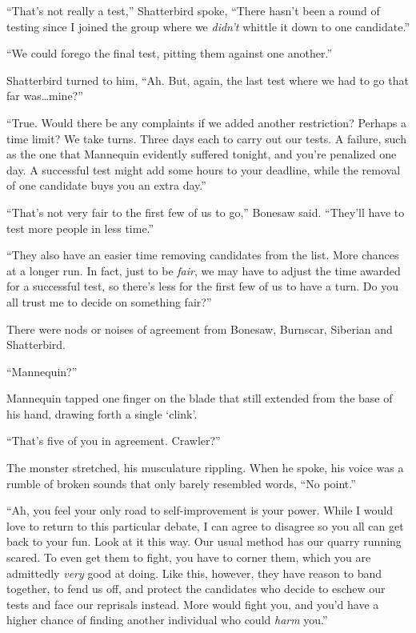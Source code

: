 ``That's not really a test,'' Shatterbird spoke, ``There hasn't been a round of testing since I joined the group where we \emph{didn't} whittle it down to one candidate.''



``We could forego the final test, pitting them against one another.''



Shatterbird turned to him, ``Ah.  But, again, the last test where we had to go that far was\ldots mine?''



``True.  Would there be any complaints if we added another restriction?  Perhaps a time limit?  We take turns.  Three days each to carry out our tests.  A failure, such as the one that Mannequin evidently suffered tonight, and you're penalized one day.  A successful test might add some hours to your deadline, while the removal of one candidate buys you an extra day.''



``That's not very fair to the first few of us to go,'' Bonesaw said.  ``They'll have to test more people in less time.''



``They also have an easier time removing candidates from the list.  More chances at a longer run.  In fact, just to be \emph{fair}, we may have to adjust the time awarded for a successful test, so there's less for the first few of us to have a turn.  Do you all trust me to decide on something fair?''



There were nods or noises of agreement from Bonesaw, Burnscar, Siberian and Shatterbird.



``Mannequin?''



Mannequin tapped one finger on the blade that still extended from the base of his hand, drawing forth a single `clink'.



``That's five of you in agreement.  Crawler?''



The monster stretched, his musculature rippling.  When he spoke, his voice was a rumble of broken sounds that only barely resembled words, ``No point.''



``Ah, you feel your only road to self-improvement is your power.  While I would love to return to this particular debate, I can agree to disagree so you all can get back to your fun.  Look at it this way.  Our usual method has our quarry running scared.  To even get them to fight, you have to corner them, which you are admittedly \emph{very} good at doing.  Like this, however, they have reason to band together, to fend us off, and protect the candidates who decide to eschew our tests and face our reprisals instead.  More would fight you, and you'd have a higher chance of finding another individual who could \emph{harm} you.''



